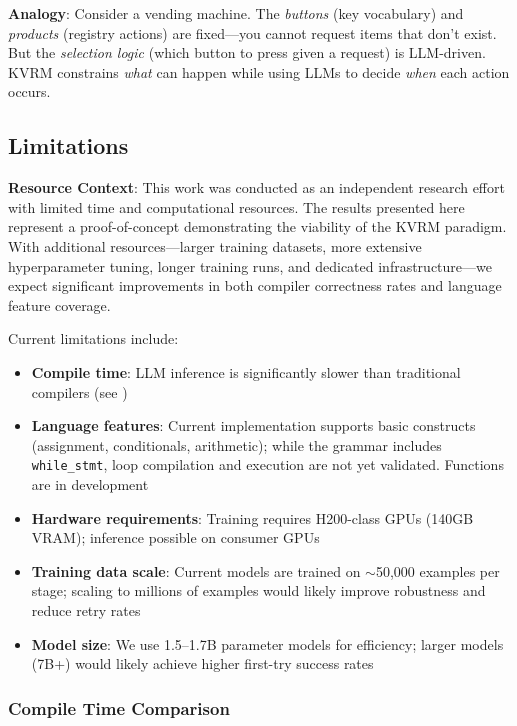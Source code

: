 \documentclass[11pt,a4paper]{article}
\begin{document}
\textbf{Analogy}: Consider a vending machine. The \textit{buttons} (key vocabulary) and \textit{products} (registry actions) are fixed---you cannot request items that don't exist. But the \textit{selection logic} (which button to press given a request) is LLM-driven. KVRM constrains \textit{what} can happen while using LLMs to decide \textit{when} each action occurs.

\subsection{Limitations}

\textbf{Resource Context}: This work was conducted as an independent research effort with limited time and computational resources. The results presented here represent a proof-of-concept demonstrating the viability of the KVRM paradigm. With additional resources---larger training datasets, more extensive hyperparameter tuning, longer training runs, and dedicated infrastructure---we expect significant improvements in both compiler correctness rates and language feature coverage.

Current limitations include:

\begin{itemize}
    \item \textbf{Compile time}: LLM inference is significantly slower than traditional compilers (see )
    \item \textbf{Language features}: Current implementation supports basic constructs (assignment, conditionals, arithmetic); while the grammar includes \texttt{while\_stmt}, loop compilation and execution are not yet validated. Functions are in development
    \item \textbf{Hardware requirements}: Training requires H200-class GPUs (140GB VRAM); inference possible on consumer GPUs
    \item \textbf{Training data scale}: Current models are trained on $\sim$50,000 examples per stage; scaling to millions of examples would likely improve robustness and reduce retry rates
    \item \textbf{Model size}: We use 1.5--1.7B parameter models for efficiency; larger models (7B+) would likely achieve higher first-try success rates
\end{itemize}

\subsubsection{Compile Time Comparison}
\end{document}
